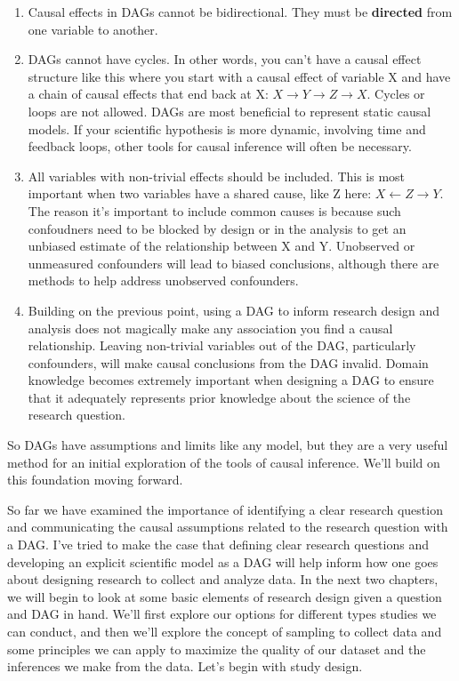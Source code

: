 \documentclass[
]{book}
\begin{document}
\begin{enumerate}
\def\labelenumi{\arabic{enumi}.}
\item
  Causal effects in DAGs cannot be bidirectional. They must be \textbf{directed} from one variable to another.
\item
  DAGs cannot have cycles. In other words, you can't have a causal effect structure like this where you start with a causal effect of variable X and have a chain of causal effects that end back at X: \(X \to Y \to Z \to X\). Cycles or loops are not allowed. DAGs are most beneficial to represent static causal models. If your scientific hypothesis is more dynamic, involving time and feedback loops, other tools for causal inference will often be necessary.
\item
  All variables with non-trivial effects should be included. This is most important when two variables have a shared cause, like Z here: \(X \gets Z \to Y\). The reason it's important to include common causes is because such confoudners need to be blocked by design or in the analysis to get an unbiased estimate of the relationship between X and Y. Unobserved or unmeasured confounders will lead to biased conclusions, although there are methods to help address unobserved confounders.
\item
  Building on the previous point, using a DAG to inform research design and analysis does not magically make any association you find a causal relationship. Leaving non-trivial variables out of the DAG, particularly confounders, will make causal conclusions from the DAG invalid. Domain knowledge becomes extremely important when designing a DAG to ensure that it adequately represents prior knowledge about the science of the research question.
\end{enumerate}

So DAGs have assumptions and limits like any model, but they are a very useful method for an initial exploration of the tools of causal inference. We'll build on this foundation moving forward.

So far we have examined the importance of identifying a clear research question and communicating the causal assumptions related to the research question with a DAG. I've tried to make the case that defining clear research questions and developing an explicit scientific model as a DAG will help inform how one goes about designing research to collect and analyze data. In the next two chapters, we will begin to look at some basic elements of research design given a question and DAG in hand. We'll first explore our options for different types studies we can conduct, and then we'll explore the concept of sampling to collect data and some principles we can apply to maximize the quality of our dataset and the inferences we make from the data. Let's begin with study design.
\end{document}
